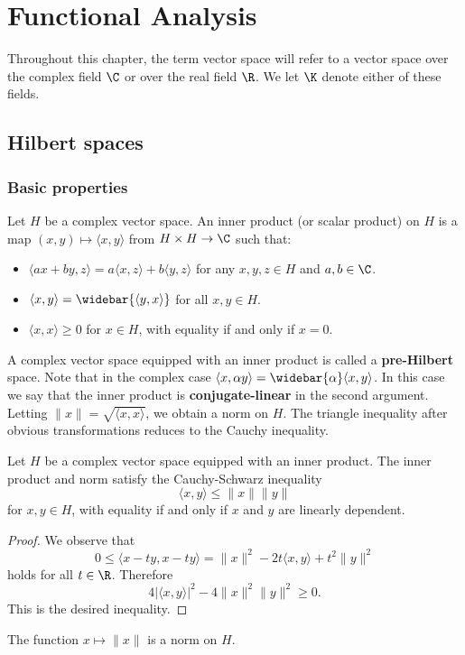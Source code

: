 \chapter{Functional Analysis}
Throughout this chapter, the term vector space will refer to a vector space over the complex field $\C$ or over the real field $\R$. We let $\K$ denote either of these fields.
\section{Hilbert spaces}
\subsection{Basic properties}
Let $H$ be a complex vector space. An inner product (or scalar product) on $H$ is a map $(x,y)\mapsto\langle x,y\rangle$ from $H\times H\to\C$ such that:
\begin{itemize}
\item $\langle ax+by,z\rangle=a\langle x,z\rangle+b\langle y,z\rangle$ for any $x,y,z\in H$ and $a,b\in\C$.
\item $\langle x,y\rangle=\widebar{\langle y,x\rangle}$ for all $x,y\in H$.
\item $\langle x,x\rangle\geq 0$ for $x\in H$, with equality if and only if $x=0$.
\end{itemize}
A complex vector space equipped with an inner product is called a \textbf{pre-Hilbert} space. Note that in the complex case $\langle x,\alpha y\rangle=\widebar{\alpha}\langle x,y\rangle$. In this case we say that the inner product is \textbf{conjugate-linear} in the second argument. Letting $\|x\|=\sqrt{\langle x,x\rangle}$, we obtain a norm on $H$. The triangle inequality after obvious transformations reduces to the Cauchy inequality.
\begin{proposition}
Let $H$ be a complex vector space equipped with an inner product. The inner product and norm satisfy the Cauchy-Schwarz inequality
\[\langle x,y\rangle\leq\|x\|\|y\|\]
for $x,y\in H$, with equality if and only if $x$ and $y$ are linearly dependent.
\end{proposition}
\begin{proof}
We observe that
\[0\leq\langle x-ty,x-ty\rangle=\|x\|^2-2t\langle x,y\rangle+t^2\|y\|^2\]
holds for all $t\in\R$. Therefore
\[4|\langle x,y\rangle|^2-4\|x\|^2\|y\|^2\geq 0.\]
This is the desired inequality.
\end{proof}
\begin{corollary}
The function $x\mapsto\|x\|$ is a norm on $H$.
\end{corollary}

